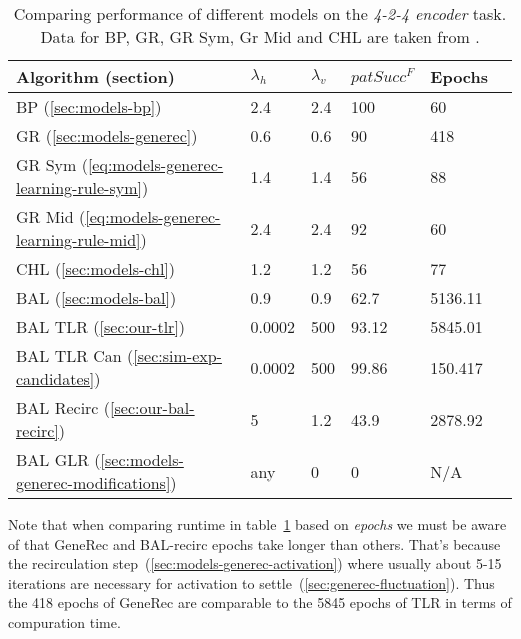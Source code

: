 \begin{table}[H] 
  \centering
    \begin{tabular}{|l|l|l|l|l|l|}
    \hline
    Algorithm (section)&$\lambda_h$&$\lambda_v$&$patSucc^F$ &Epochs\\ %
    \hline
    BP (\ref{sec:models-bp}) &2.4 &2.4 &100&60\\ %
    \hline
    GR (\ref{sec:models-generec}) &0.6 &0.6 &90&418\\ %
    \hline
    GR Sym (\ref{eq:models-generec-learning-rule-sym}) &1.4 &1.4 &56&88\\ %
    \hline
    GR Mid (\ref{eq:models-generec-learning-rule-mid}) &2.4 &2.4 &92&60\\ %
    \hline
    CHL (\ref{sec:models-chl}) &1.2 &1.2 &56&77\\ %
    \hline
    BAL (\ref{sec:models-bal})&0.9 &0.9 &62.7& 5136.11\\ %
    \hline
    BAL TLR (\ref{sec:our-tlr})&0.0002  & 500&93.12&5845.01\\ %
    \hline
    BAL TLR Can (\ref{sec:sim-exp-candidates})&0.0002&500&99.86&150.417\\ %
    \hline
    BAL Recirc (\ref{sec:our-bal-recirc})&5&1.2&43.9&2878.92\\ %
    \hline
    BAL GLR (\ref{sec:models-generec-modifications})& any & 0 & 0 & N/A \\ 
    \hline 
    \end{tabular}
  \caption{Comparing performance of different models on the \emph{4-2-4 encoder} task. Data for BP, GR, GR Sym, Gr Mid and CHL are taken from \citet{o1996bio}.} 
  \label{tab:results-cmp-auto4}
\end{table}

Note that when comparing runtime in table~\ref{tab:results-cmp-auto4} based on \emph{epochs} we must be aware of that GeneRec and BAL-recirc epochs take longer than others. That's because the recirculation step~(\ref{sec:models-generec-activation}) where usually about 5-15 iterations are necessary for activation to settle~(\ref{sec:generec-fluctuation}). Thus the 418 epochs of GeneRec are comparable to the 5845 epochs of TLR in terms of compuration time. 

